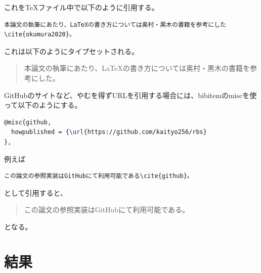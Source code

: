 \documentclass[titlepage]{jsreport}
\begin{document}
これをTeXファイル中で以下のように引用する。

\begin{verbatim}
本論文の執筆にあたり、LaTeXの書き方については奥村・黒木の書籍を参考にした\cite{okumura2020}。
\end{verbatim}

これは以下のようにタイプセットされる。
\begin{quotation}
    本論文の執筆にあたり、LaTeXの書き方については奥村・黒木の書籍を参考にした\cite{okumura2020}。
\end{quotation}


GitHubのサイトなど、やむを得ずURLを引用する場合には、bibitemのmiscを使って以下のようにする。

\begin{lstlisting}[language=TeX]
@misc{github,
  howpublished = {\url{https://github.com/kaityo256/rbs}
},
\end{lstlisting}

例えば

\begin{verbatim}
この論文の参照実装はGitHubにて利用可能である\cite{github}。
\end{verbatim}
として引用すると、

\begin{quotation}
    この論文の参照実装はGitHubにて利用可能である\cite{github}。
\end{quotation}
となる。




\chapter{結果} \label{chap:results}
\end{document}

